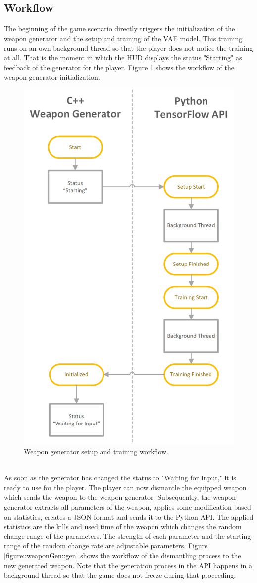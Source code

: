 \documentclass[MGS,Master,english]{twbook}%
\begin{document}
\subsection{Workflow}
The beginning of the game scenario directly triggers the initialization of the weapon generator and the setup and training of the VAE model. This training runs on an own background thread so that the player does not notice the training at all. That is the moment in which the HUD displays the status "Starting" as feedback of the generator for the player. Figure \ref{figure::weaponGen::init} shows the workflow of the weapon generator initialization.
\begin{figure}[!ht]
	\centering
	\includegraphics[width=0.5\linewidth]{PICs/WeaponGeneratorWorkflow_Setup_Training}
	\caption{Weapon generator setup and training workflow.} \label{figure::weaponGen::init}
\end{figure}\\
As soon as the generator has changed the status to "Waiting for Input," it is ready to use for the player. The player can now dismantle the equipped weapon which sends the weapon to the weapon generator. Subsequently, the weapon generator extracts all parameters of the weapon, applies some modification based on statistics, creates a JSON format and sends it to the Python API. The applied statistics are the kills and used time of the weapon which changes the random change range of the parameters. The strength of each parameter and the starting range of the random change rate are adjustable parameters. Figure \ref{figure::weaponGen::gen} shows the workflow of the dismantling process to the new generated weapon. Note that the generation process in the API happens in a background thread so that the game does not freeze during that proceeding.
\end{document}
